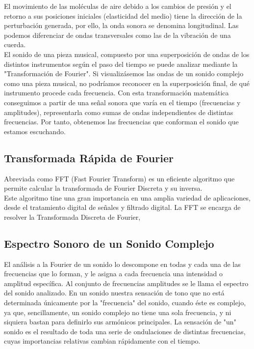 \documentclass[10pt,a4paper]{book}
\begin{document}
El movimiento de las moléculas de aire debido a los cambios de presión y el retorno a sus posiciones iniciales (elasticidad del medio) tiene la dirección de la perturbación generada, por ello, la onda sonora se denomina longitudinal. Las podemos diferenciar de ondas transversales como las de la vibración de una cuerda.\\

El sonido de una pieza musical, compuesto por una superposición de ondas de los distintos instrumentos según el paso del tiempo se puede analizar mediante la "Transformación de Fourier". Si visualizásemos las ondas de un sonido complejo como una pieza musical, no podríamos reconocer en la superposición final, de qué instrumento procede cada frecuencia. Con esta transformación matemática conseguimos a partir de una señal sonora que varía en el tiempo (frecuencias y amplitudes), representarla como sumas de ondas independientes de distintas frecuencias. Por tanto, obtenemos las frecuencias que conforman el sonido que estamos escuchando.

\subsection{Transformada Rápida de Fourier}

Abreviada como FFT (Fast Fourier Transform) es un eficiente algoritmo que permite calcular la transformada de Fourier Discreta y su inversa. \\ Este algoritmo tine una gran importancia en una amplia variedad de aplicaciones, desde el tratamiento digital de señales y filtrado digital. La FFT se encarga de resolver la Transformada Discreta de Fourier,  

\subsection{Espectro Sonoro de un Sonido Complejo}

El análisis a la Fourier de un sonido lo descompone en todas y cada una de las frecuencias que lo forman, y le asigna a cada frecuencia una intensidad o amplitud específica. Al conjunto de frecuencias amplitudes se le llama el espectro del sonido analizado.
En un sonido nuestra sensación de tono que no está determinada únicamente por la "frecuencia" del sonido, cuando éste es complejo, ya que, sencillamente, un sonido complejo no tiene una sola frecuencia, y ni siquiera bastan para definirlo sus armónicos principales. La sensación de "un" sonido es el resultado de toda una serie de ondulaciones de distintas frecuencias, cuyas importancias relativas cambian rápidamente con el tiempo.\\
\end{document}

